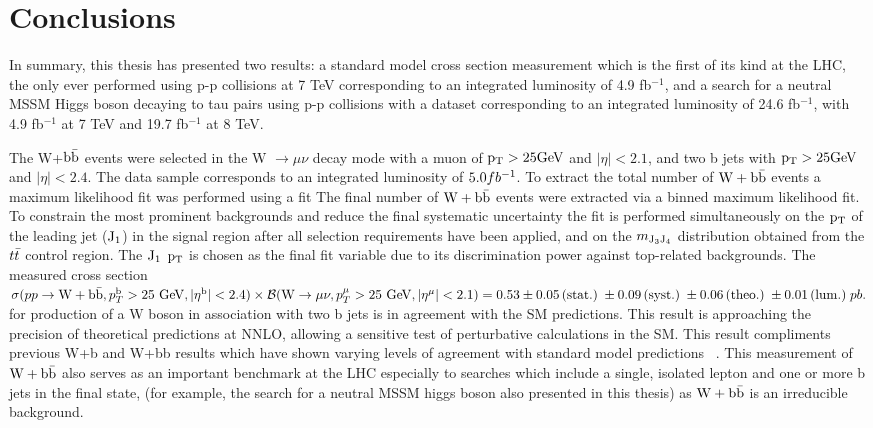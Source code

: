 \chapter{Conclusions}
In summary, this thesis has presented two results:
a standard model cross section measurement 
which is the first of its kind at the LHC, the only 
ever performed using p-p collisions at 7 TeV corresponding to
an integrated luminosity of 4.9 fb$^{-1}$, and a search for 
a neutral MSSM Higgs boson decaying to tau pairs using p-p collisions
with a dataset corresponding to an integrated luminosity of 
24.6 fb$^{-1}$, with 4.9 fb$^{-1}$ at 7 TeV and 19.7 fb$^{-1}$ at 8 TeV. 

The W+$\mathrm{b\bar{b}}$ events were selected in the W $\to \mu\nu$ decay mode with a 
muon of $\mathrm{p_{T}}>25\mathrm{GeV}$ and $|\eta|<2.1$, and two b jets with $\mathrm{p_{T}}>25\mathrm{GeV}$ and $|\eta|<2.4$. 
The data sample corresponds to an integrated luminosity of $5.0fb^\mathrm{-1}$. 
To extract the total number of $\mathrm{W+\mathrm{b\bar{b}}}$ events a maximum likelihood fit
was performed using a fit 
The final number of $\mathrm{W+\mathrm{b\bar{b}}}$ events were extracted via a binned maximum likelihood fit.
To constrain the most prominent backgrounds and reduce the final
systematic uncertainty the fit is performed simultaneously on the $\mathrm{p_{T}}$ of the leading jet ($\rm{J_1}$) 
in the signal region after all selection requirements have been applied,
and on the $m_{\rm{J_3 J_4}}$ distribution obtained from the $t\bar{t}$ control region.
The  $\rm{J_1}$ $\mathrm{p_{T}}$  is chosen as the final fit variable due to its discrimination power against top-related backgrounds. The measured cross section 
$\sigma(pp\rightarrow \mathrm{W} + \mathrm{b\bar{b}}, p_T^{\mathrm{b}}>25~\mathrm{GeV}, |\eta^{\mathrm{b}}|<2.4)\times {\cal{B}}(\mathrm{W}\rightarrow \mu\nu, p_T^{\mu}>25~\mathrm{GeV}, |\eta^{\mu}|<2.1) =0.53\pm  0.05\,\mathrm{(stat.)\;} \pm 0.09 \,\mathrm{(syst.)\;} \pm 0.06 \,\mathrm{(theo.)}\; \pm 0.01\,\mathrm{(lum.)\;} pb.$
for production of a W boson in association with two b jets is in agreement with
the SM predictions.
This result is approaching the precision of theoretical predictions at NNLO, 
allowing a sensitive test of perturbative calculations
in the SM. This result compliments previous W+b and W+bb results which
have shown varying levels of agreement 
with standard model predictions ~\cite{Aaltonen:2009qi,D0:2012qt,Aad:2011kp}. 
This measurement of $\mathrm{W+\mathrm{b\bar{b}}}$ also serves as an important
benchmark at the LHC especially to 
searches which include a single, isolated lepton and one or more b jets in the final state,
(for example, the search for a neutral MSSM higgs boson also presented in this thesis) 
as $\mathrm{W+\mathrm{b\bar{b}}}$ is an irreducible background. %

